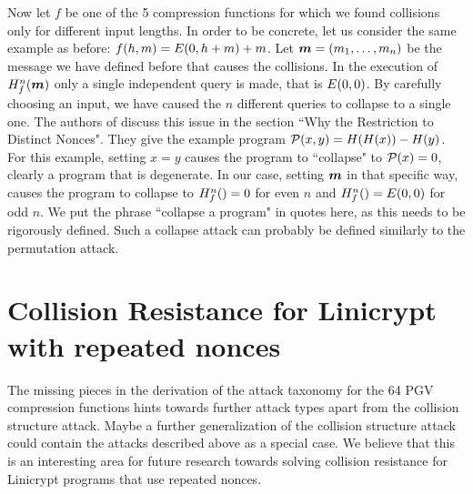 Now let $f$ be one of the 5 compression functions for which we found collisions only for different input lengths.
In order to be concrete, let us consider the same example as before: $f(h,m) = \E(0, h+m) +m$.
Let $\vm = (\dts m n)$ be the message we have defined before that causes the collisions.
In the execution of $\H^n_f(\vm)$ only a single independent query is made, that is $\E(0,0)$.
By carefully choosing an input, we have caused the $n$ different queries to collapse to a single one.
The authors of \cite{TCC:McQSwoRos19} discuss this issue in the section ``Why the Restriction to Distinct Nonces".
They give the example program $\P(x,y) = \H(\H(x)) - \H(y)$.
For this example, setting $x=y$ causes the program to ``collapse" to $\P(x) = 0$,
clearly a program that is degenerate.
In our case, setting $\vm$ in that specific way,
causes the program to collapse to $\H^n_f() = 0$ for even $n$ and $\H^n_f() = E(0,0)$ for odd $n$.
We put the phrase ``collapse a program" in quotes here, as this needs to be rigorously defined.
Such a collapse attack can probably be defined similarly to the permutation attack.

\section{Collision Resistance for Linicrypt with repeated nonces}
The missing pieces in the derivation of the attack taxonomy for the 64 PGV compression functions
hints towards further attack types apart from the collision structure attack.
Maybe a further generalization of the collision structure attack could contain the attacks described above as a special case.
We believe that this is an interesting area for future research
towards solving collision resistance for Linicrypt programs that use repeated nonces.

